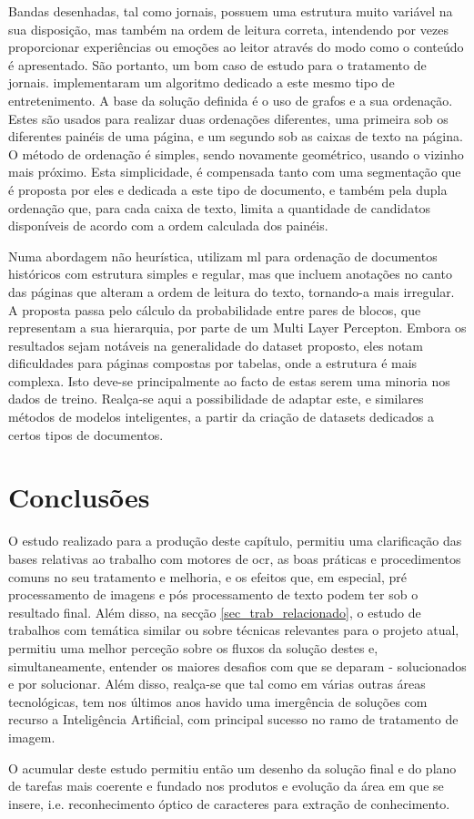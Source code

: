 Bandas desenhadas, tal como jornais, possuem uma estrutura muito variável na sua disposição, mas também na ordem de leitura correta, intendendo por vezes proporcionar experiências ou emoções ao leitor através do modo como o conteúdo é apresentado. São portanto, um bom caso de estudo para o tratamento de jornais. \cite{7351614} implementaram um algoritmo dedicado a este mesmo tipo de entretenimento. A base da solução definida é o uso de grafos e a sua ordenação. Estes são usados para realizar duas ordenações diferentes, uma primeira sob os diferentes painéis de uma página, e um segundo sob as caixas de texto na página. O método de ordenação é simples, sendo novamente geométrico, usando o vizinho mais próximo. Esta simplicidade, é compensada tanto com uma segmentação que é proposta por eles e dedicada a este tipo de documento, e também pela dupla ordenação que, para cada caixa de texto, limita a quantidade de candidatos disponíveis de acordo com a ordem calculada dos painéis.

Numa abordagem não heurística, \cite{9413256} utilizam \acrshort{ml} para ordenação de documentos históricos com estrutura simples e regular, mas que incluem anotações no canto das páginas que alteram a ordem de leitura do texto, tornando-a mais irregular. A proposta passa pelo cálculo da probabilidade entre pares de blocos, que representam a sua hierarquia, por parte de um Multi Layer Percepton. Embora os resultados sejam notáveis na generalidade do dataset proposto, eles notam dificuldades para páginas compostas por tabelas, onde a estrutura é mais complexa. Isto deve-se principalmente ao facto de estas serem uma minoria nos dados de treino. Realça-se aqui a possibilidade de adaptar este, e similares métodos de modelos inteligentes, a partir da criação de datasets dedicados a certos tipos de documentos.



\section{Conclusões}

O estudo realizado para a produção deste capítulo, permitiu uma clarificação das bases relativas ao trabalho com motores de \acrshort{ocr}, as boas práticas e procedimentos comuns no seu tratamento e melhoria, e os efeitos que, em especial, pré processamento de imagens e pós processamento de texto podem ter sob o resultado final. Além disso, na secção \ref{sec_trab_relacionado}, o estudo de trabalhos com temática similar ou sobre técnicas relevantes para o projeto atual, permitiu uma melhor perceção sobre os fluxos da solução destes e, simultaneamente, entender os maiores desafios com que se deparam - solucionados e por solucionar. Além disso, realça-se que tal como em várias outras áreas tecnológicas, tem nos últimos anos havido uma imergência de soluções com recurso a Inteligência Artificial, com principal sucesso no ramo de tratamento de imagem.

O acumular deste estudo permitiu então um desenho da solução final e do plano de tarefas mais coerente e fundado nos produtos e evolução da área em que se insere, i.e. reconhecimento óptico de caracteres para extração de conhecimento.

